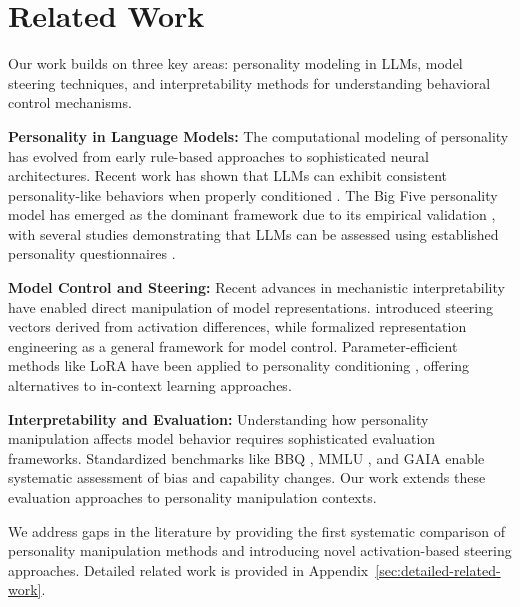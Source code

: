 \section{Related Work}

Our work builds on three key areas: personality modeling in LLMs, model steering techniques, and interpretability methods for understanding behavioral control mechanisms.

\textbf{Personality in Language Models:} The computational modeling of personality has evolved from early rule-based approaches \citep{mairesse-walker-2007-personage} to sophisticated neural architectures. Recent work has shown that LLMs can exhibit consistent personality-like behaviors when properly conditioned \citep{jiang-etal-2023-personallm, huang-etal-2023-chatgpt-personality}. The Big Five personality model has emerged as the dominant framework due to its empirical validation \citep{costa-mccrae-1992-big5}, with several studies demonstrating that LLMs can be assessed using established personality questionnaires \citep{serapio-garcia-etal-2023-personality-traits-llms}.

\textbf{Model Control and Steering:} Recent advances in mechanistic interpretability have enabled direct manipulation of model representations. \citet{turner-etal-2023-activation-steering} introduced steering vectors derived from activation differences, while \citet{li-etal-2023-representation-engineering} formalized representation engineering as a general framework for model control. Parameter-efficient methods like LoRA \citep{hu-etal-2022-lora} have been applied to personality conditioning \citep{zhang-etal-2023-peft-personality}, offering alternatives to in-context learning approaches.

\textbf{Interpretability and Evaluation:} Understanding how personality manipulation affects model behavior requires sophisticated evaluation frameworks. Standardized benchmarks like BBQ \citep{parrish-etal-2022-bbq}, MMLU \citep{hendrycks-etal-2021-mmlu}, and GAIA \citep{mialon-etal-2023-gaia} enable systematic assessment of bias and capability changes. Our work extends these evaluation approaches to personality manipulation contexts.

We address gaps in the literature by providing the first systematic comparison of personality manipulation methods and introducing novel activation-based steering approaches. Detailed related work is provided in Appendix~\ref{sec:detailed-related-work}.